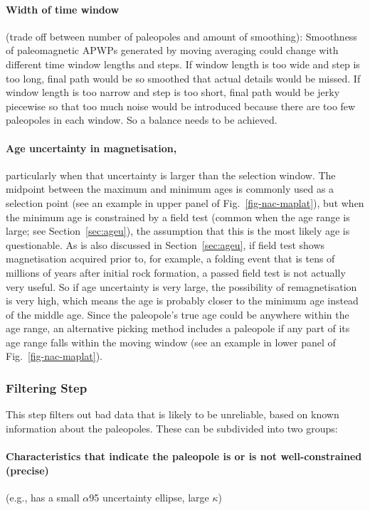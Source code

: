 \paragraph{Width of time window}
(trade off between number of paleopoles and amount of smoothing): Smoothness of
paleomagnetic APWPs generated by moving averaging could change with different
time window lengths and steps. If window length is too wide and step is too
long, final path would be so smoothed that actual details would be missed. If
window length is too narrow and step is too short, final path would be jerky
piecewise so that too much noise would be introduced because there are too few
paleopoles in each window. So a balance needs to be achieved.

\paragraph{Age uncertainty in magnetisation,}
particularly when that uncertainty is larger than the selection window. The
midpoint between the maximum and minimum ages is commonly used as a selection
point (see an example in upper panel of Fig.~\ref{fig-nac-maplat}), but when the
minimum age is constrained by a field test (common when the age range is large;
see Section~\ref{sec:ageu}), the assumption that this is the most likely age is
questionable. As is also discussed in Section~\ref{sec:ageu}, if field test
shows magnetisation acquired prior to, for example, a folding event that is tens
of millions of years after initial rock formation, a passed field test is not
actually very useful. So if age uncertainty is very large, the possibility of
remagnetisation is very high, which means the age is probably closer to the
minimum age instead of the middle age. Since the paleopole's true age could be
anywhere within the age range, an alternative picking method includes a
paleopole if any part of its age range falls within the moving window (see an
example in lower panel of Fig.~\ref{fig-nac-maplat}).

\subsubsection{Filtering Step}

This step filters out bad data that is likely to be unreliable, based on known
information about the paleopoles. These can be subdivided into two groups:

\paragraph{Characteristics that indicate the paleopole is or is not
well-constrained (precise)}
(e.g., has a small $\alpha$95 uncertainty ellipse, large $\kappa$)

